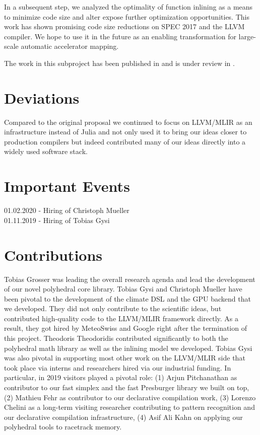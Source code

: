 \documentclass[11pt, manuscript,\review anonymous]{acmart}
\begin{document}
In a subsequent step, we analyzed the optimality of function inlining as a means
to minimize code size and alter expose further optimization opportunities. This
work has shown promising code size reductions on SPEC 2017 and the LLVM compiler.
We hope to use it in the future as an enabling transformation for large-scale
automatic accelerator mapping.

The work in this subproject has been published in \citet{copic2021} and is under review in
\citet{theo2021}.

\section{Deviations}

Compared to the original proposal we continued to focus on LLVM/MLIR as an
infrastructure instead of Julia and not only used it to bring our ideas closer
to production compilers but indeed contributed many of our ideas directly into
a widely used software stack.

\section{Important Events}

01.02.2020 - Hiring of Christoph Mueller\\
01.11.2019 - Hiring of Tobias Gysi

\section{Contributions}

Tobias Grosser was leading the overall research agenda and lead the development
of our novel polyhedral core library. Tobias Gysi and Christoph Mueller have
been pivotal to the development of the climate DSL and the GPU backend that we
developed. They did not only contribute to the scientific ideas, but
contributed high-quality code to the LLVM/MLIR framework directly. As a result,
they got hired by MeteoSwiss and Google right after the termination of this
project. Theodoris Theodoridis contributed significantly to both the polyhedral
math library as well as the inlining model we developed. Tobias Gysi was also
pivotal in supporting most other work on the LLVM/MLIR side that took place via
interns and researchers hired via our industrial funding. In particular, in
2019 visitors played a pivotal role: (1) Arjun Pitchanathan as contributor
to our fast simplex and the fast Presburger library we built on top, (2)
Mathieu Fehr as contributor to our declarative compilation work, (3) Lorenzo
Chelini as a long-term visiting researcher contributing to pattern recognition
and our declarative compilation infrastructure, (4) Asif Ali Kahn on applying
our polyhedral tools to racetrack memory.
\end{document}
